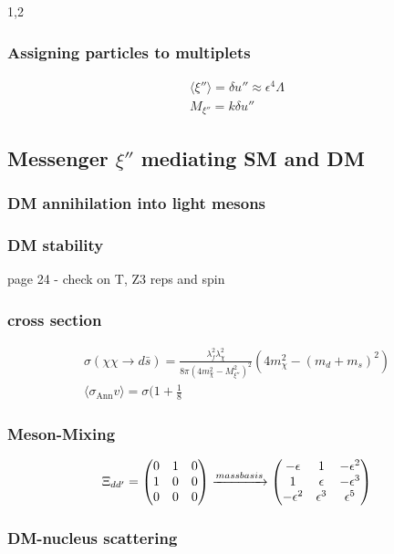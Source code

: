 \documentclass[11pt,a4paper,twoside]{article}
\begin{document}
\begin{spacing}{1,2}
\subsubsection{Assigning particles to multiplets}
\begin{align}
 \langle \xi'' \rangle = \delta u''\approx \epsilon^4 \Lambda\\
 M_{\xi''} = k \delta u'' 
\end{align}

\subsection{Messenger $\xi''$ mediating SM and DM}
\subsubsection{DM annihilation into light mesons}
\subsubsection*{DM stability}
page 24 - check on T, Z3 reps and spin
\subsubsection*{cross section}
\begin{align}
 \sigma(\chi\chi \rightarrow d \bar s) = \frac{\lambda_f^2\lambda_\chi^2}{8\pi(4m_\chi^2 - M_{\xi''}^2)^2}(4m_\chi^2 - (m_d+m_s)^2)\\
 \langle \sigma_{\text{Ann}} v \rangle = \sigma(1+\frac18
\end{align}

\subsubsection{Meson-Mixing}
\begin{align}
 \Xi_{dd'} = \begin{pmatrix}
              0 & 1 & 0\\
              1 & 0 & 0 \\
              0 & 0 & 0
             \end{pmatrix} \xrightarrow{massbasis} \begin{pmatrix}
						-\epsilon & 1 & -\epsilon^2\\
						1 & \epsilon & -\epsilon^3\\
						-\epsilon^2 & \-\epsilon^3 & \epsilon^5
						\end{pmatrix}
\end{align}

\subsubsection{DM-nucleus scattering}


\newpage\listoffigures\newpage
{}
\listoftables\newpage
\end{spacing}
\end{document}
